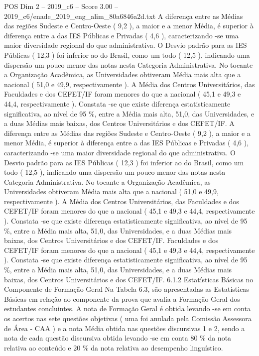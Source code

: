 \begin{textsample}{POS Dim 2 – 2019\_c6 – Score 3.00 – 2019\_c6/enade\_2019\_eng\_alim\_80a6846a2d.txt}
A diferença entre as Médias das regiões Sudeste e Centro-Oeste ( 9,2 ), a maior e a menor Média, é superior à diferença entre a das IES Públicas e Privadas ( 4,6 ), caracterizando -se uma maior diversidade regional do que administrativa.
O Desvio padrão para as IES Públicas ( 12,3 ) foi inferior ao do Brasil, como um todo ( 12,5 ), indicando uma dispersão um pouco menor das notas nesta Categoria Administrativa.
No tocante a Organização Acadêmica, as Universidades obtiveram Média mais alta que a nacional ( 51,0 e 49,9, respectivamente ).
A Média dos Centros Universitários, das Faculdades e dos CEFET/IF foram menores do que a nacional ( 45,1 e 49,3 e 44,4, respectivamente ).
Constata -se que existe diferença estatisticamente significativa, ao nível de 95 \%, entre a Média mais alta, 51,0, das Universidades, e a duas Médias mais baixas, dos Centros Universitários e dos CEFET/IF.
A diferença entre as Médias das regiões Sudeste e Centro-Oeste ( 9,2 ), a maior e a menor Média, é superior à diferença entre a das IES Públicas e Privadas ( 4,6 ), caracterizando -se uma maior diversidade regional do que administrativa.
O Desvio padrão para as IES Públicas ( 12,3 ) foi inferior ao do Brasil, como um todo ( 12,5 ), indicando uma dispersão um pouco menor das notas nesta Categoria Administrativa.
No tocante a Organização Acadêmica, as Universidades obtiveram Média mais alta que a nacional ( 51,0 e 49,9, respectivamente ).
A Média dos Centros Universitários, das Faculdades e dos CEFET/IF foram menores do que a nacional ( 45,1 e 49,3 e 44,4, respectivamente ).
Constata -se que existe diferença estatisticamente significativa, ao nível de 95 \%, entre a Média mais alta, 51,0, das Universidades, e a duas Médias mais baixas, dos Centros Universitários e dos CEFET/IF.
Faculdades e dos CEFET/IF foram menores do que a nacional ( 45,1 e 49,3 e 44,4, respectivamente ).
Constata -se que existe diferença estatisticamente significativa, ao nível de 95 \%, entre a Média mais alta, 51,0, das Universidades, e a duas Médias mais baixas, dos Centros Universitários e dos CEFET/IF. 6.1.2 Estatísticas Básicas no Componente de Formação Geral Na Tabela 6.3, são apresentadas as Estatísticas Básicas em relação ao componente da prova que avalia a Formação Geral dos estudantes concluintes.
A nota de Formação Geral é obtida levando -se em conta os acertos nas sete questões objetivas ( uma foi anulada pela Comissão Assessora de Área - CAA ) e a nota Média obtida nas questões discursivas 1 e 2, sendo a nota de cada questão discursiva obtida levando -se em conta 80 \% da nota relativa ao conteúdo e 20 \% da nota relativa ao desempenho linguístico.

\end{textsample}
